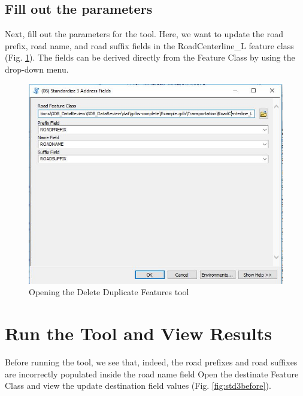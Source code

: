 \documentclass[openany]{book}
\theoremstyle{definition}
\theoremstyle{definition}
\theoremstyle{definition}
\theoremstyle{remark}
\begin{document}
\subsection{Fill out the parameters}\label{fill-out-the-parameters-6}

Next, fill out the parameters for the tool. Here, we want to update the
road prefix, road name, and road suffix fields in the RoadCenterline\_L
feature class (Fig. \ref{fig:std3params}). The fields can be derived
directly from the Feature Class by using the drop-down menu.

\begin{figure}[H]

{\centering \includegraphics{figures/std3-toolparams} 

}

\caption{Opening the Delete Duplicate Features tool}\label{fig:std3params}
\end{figure}

\section{Run the Tool and View
Results}\label{run-the-tool-and-view-results-6}

Before running the tool, we see that, indeed, the road prefixes and road
suffixes are incorrectly populated inside the road name field Open the
destinate Feature Class and view the update destination field values
(Fig. \ref{fig:std3before}).
\end{document}
